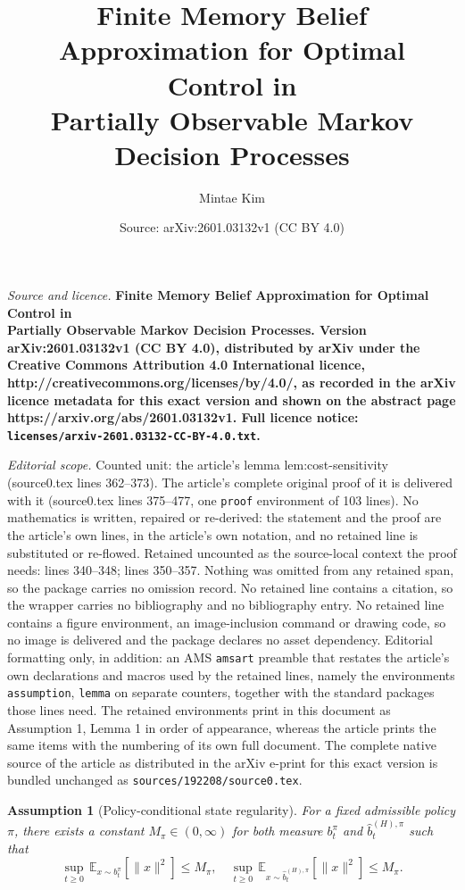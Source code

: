 \documentclass[10pt,a4paper]{amsart}
\title{\LARGE \bf Finite Memory Belief Approximation for Optimal Control in \\ Partially Observable Markov Decision Processes}
\author{Mintae Kim}
\date{Source: arXiv:2601.03132v1 (CC BY 4.0)}
\newtheorem{assumption}{Assumption}
\begin{document}
\maketitle

\noindent\emph{Source and licence.} \LARGE \bf Finite Memory Belief Approximation for Optimal Control in \\ Partially Observable Markov Decision Processes. Version arXiv:2601.03132v1 (CC BY 4.0), distributed by arXiv under the Creative Commons Attribution 4.0 International licence, http://creativecommons.org/licenses/by/4.0/, as recorded in the arXiv licence metadata for this exact version and shown on the abstract page https://arxiv.org/abs/2601.03132v1. Full licence notice: \texttt{licenses/arxiv-2601.03132-CC-BY-4.0.txt}.\par\smallskip

\noindent\textit{Editorial scope.} Counted unit: the article's lemma lem:cost-sensitivity (source0.tex lines 362--373). The article's complete original proof of it is delivered with it (source0.tex lines 375--477, one \texttt{proof} environment of 103 lines). No mathematics is written, repaired or re-derived: the statement and the proof are the article's own lines, in the article's own notation, and no retained line is substituted or re-flowed.  Retained uncounted as the source-local context the proof needs: lines 340--348; lines 350--357.  Nothing was omitted from any retained span, so the package carries no omission record.  No retained line contains a citation, so the wrapper carries no bibliography and no bibliography entry.  No retained line contains a figure environment, an image-inclusion command or drawing code, so no image is delivered and the package declares no asset dependency.  Editorial formatting only, in addition: an AMS \texttt{amsart} preamble that restates the article's own declarations and macros used by the retained lines, namely the environments \texttt{assumption}, \texttt{lemma} on separate counters, together with the standard packages those lines need.  The retained environments print in this document as Assumption 1, Lemma 1 in order of appearance, whereas the article prints the same items with the numbering of its own full document.  The complete native source of the article as distributed in the arXiv e-print for this exact version is bundled unchanged as \texttt{sources/192208/source0.tex}.
\begin{assumption}[Policy-conditional state regularity]
\label{assump:state-moment-regularity}
For a fixed admissible policy $\pi$, there exists a constant $M_\pi\in (0, \infty)$ for both measure $b_t^\pi$ and $\hat{b}_t^{(H),\pi}$ such that
\begin{equation}
\sup_{t\ge 0}\,
\mathbb{E}_{x\sim b_t^\pi}\!\left[\|x\|^2\right] \le M_\pi, \quad
\sup_{t\ge 0}\, \mathbb{E}_{x\sim \hat b_t^{(H),\pi}}\!\left[\|x\|^2\right] \le M_\pi.
\end{equation}
\end{assumption}
\end{document}
